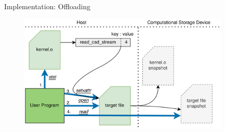 \documentclass{beamer}
\begin{document}
\begin{frame}{Implementation: Offloading}
	\begingroup
	\small %
	\begin{figure}
		\centering
		\includegraphics[width=0.9\textwidth]{resources/images/offloading.png}
	\end{figure}
	\endgroup
\end{frame}
\end{document}
